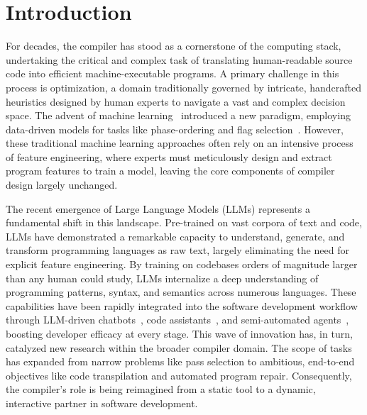 \documentclass[pdflatex,sn-mathphys-ay,twocolumn, a4paper]{sn-jnl}%
\theoremstyle{thmstyleone}%
\theoremstyle{thmstyletwo}%
\theoremstyle{thmstylethree}%
\begin{document}
\section{Introduction}\label{sec:intro}

For decades, the compiler has stood as a cornerstone of the computing stack, undertaking the critical and complex task of translating human-readable source code into efficient machine-executable programs. A primary challenge in this process is optimization, a domain traditionally governed by intricate, handcrafted heuristics designed by human experts to navigate a vast and complex decision space. The advent of machine learning~\citep{alexnet2012,resnet2016} introduced a new paradigm, employing data-driven models for tasks like phase-ordering and flag selection~\citep{mlincompilersurvey2018}. 
However, these traditional machine learning approaches often rely on an intensive process of feature engineering, where experts must meticulously design and extract program features to train a model, leaving the core components of compiler design largely unchanged.

The recent emergence of Large Language Models (LLMs) represents a fundamental shift in this landscape. Pre-trained on vast corpora of text and code, LLMs have demonstrated a remarkable capacity to understand, generate, and transform programming languages as raw text, largely eliminating the need for explicit feature engineering. By training on codebases orders of magnitude larger than any human could study, LLMs internalize a deep understanding of programming patterns, syntax, and semantics across numerous languages. These capabilities have been rapidly integrated into the software development workflow through LLM-driven chatbots~\citep{gpt4,gemini2023,claude3}, code assistants~\citep{copilot, tabnine}, and semi-automated agents~\citep{cursor_ide,gemini_cli,claude_code}, boosting developer efficacy at every stage.
This wave of innovation has, in turn, catalyzed new research within the broader compiler domain. The scope of tasks has expanded from narrow problems like pass selection to ambitious, end-to-end objectives like code transpilation and automated program repair. Consequently, the compiler's role is being reimagined from a static tool to a dynamic, interactive partner in software development.
\end{document}
